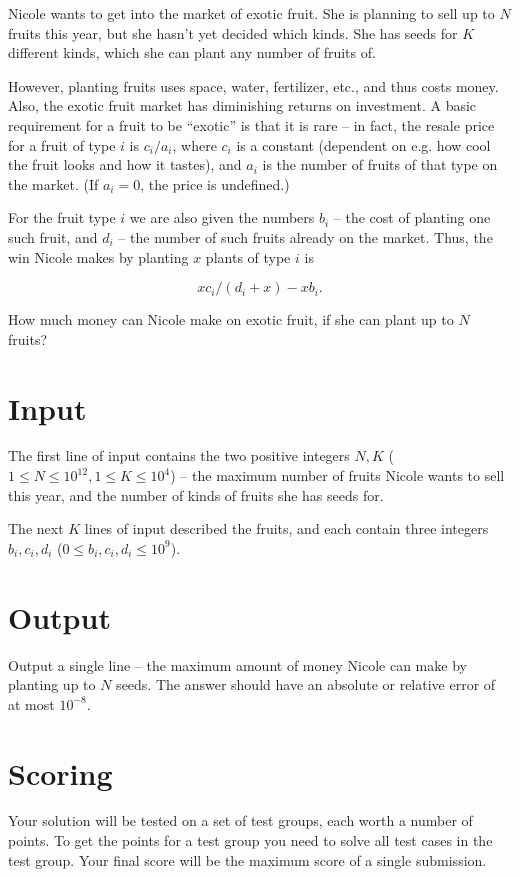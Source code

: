 Nicole wants to get into the market of exotic fruit.
She is planning to sell up to $N$ fruits this year, but she hasn't yet decided which kinds.
She has seeds for $K$ different kinds, which she can plant any number of fruits of.

However, planting fruits uses space, water, fertilizer, etc., and thus costs money.
Also, the exotic fruit market has diminishing returns on investment.
A basic requirement for a fruit to be ``exotic'' is that it is rare -- in fact, the
resale price for a fruit of type $i$ is $c_i / a_i$, where $c_i$ is a constant
(dependent on e.g. how cool the fruit looks and how it tastes), and $a_i$ is the number
of fruits of that type on the market. (If $a_i = 0$, the price is undefined.)

For the fruit type $i$ we are also given the numbers $b_i$ -- the cost of planting one
such fruit, and $d_i$ -- the number of such fruits already on the market.
Thus, the win Nicole makes by planting $x$ plants of type $i$ is

\[ x c_i / (d_i + x) - x b_i. \]

How much money can Nicole make on exotic fruit, if she can plant up to $N$ fruits?

\section*{Input}
The first line of input contains the two positive integers $N, K$ ($1 \le N \le 10^{12}, 1 \le K \le 10^4$) -- the maximum number of fruits
Nicole wants to sell this year, and the number of kinds of fruits she has seeds for.

The next $K$ lines of input described the fruits, and each contain three integers $b_i, c_i, d_i$ ($0 \le b_i, c_i, d_i \le 10^9$).

\section*{Output}
Output a single line -- the maximum amount of money Nicole can make by planting up to $N$ seeds.
The answer should have an absolute or relative error of at most $10^{-8}$.

\section*{Scoring}
Your solution will be tested on a set of test groups, each worth a number of points.
To get the points for a test group you need to solve all test cases in the test group.
Your final score will be the maximum score of a single submission.

